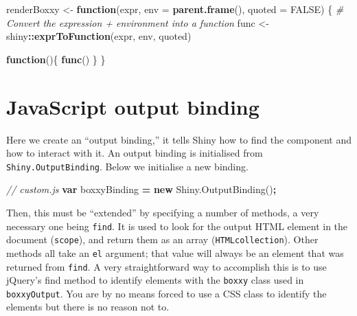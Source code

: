 \documentclass[
]{krantz}
\makeatletter
\newenvironment{Shaded}{\begin{snugshade}}{\end{snugshade}}
\newcommand{\AttributeTok}[1]{\textcolor[rgb]{0.61,0.61,0.61}{#1}}
\newcommand{\CommentTok}[1]{\textcolor[rgb]{0.37,0.37,0.37}{\textit{#1}}}
\newcommand{\ControlFlowTok}[1]{\textcolor[rgb]{0.27,0.27,0.27}{\textbf{#1}}}
\newcommand{\DataTypeTok}[1]{\textcolor[rgb]{0.27,0.27,0.27}{#1}}
\newcommand{\KeywordTok}[1]{\textcolor[rgb]{0.27,0.27,0.27}{\textbf{#1}}}
\newcommand{\NormalTok}[1]{#1}
\newcommand{\OperatorTok}[1]{\textcolor[rgb]{0.43,0.43,0.43}{\textbf{#1}}}
\newcommand{\OtherTok}[1]{\textcolor[rgb]{0.37,0.37,0.37}{#1}}
\newcommand{\StringTok}[1]{\textcolor[rgb]{0.5,0.5,0.5}{#1}}
\newcommand{\VariableTok}[1]{\textcolor[rgb]{0,0,0}{#1}}
\newenvironment{kframe}{%
\medskip{}
\setlength{\fboxsep}{.8em}
 \def\at@end@of@kframe{}%
 \ifinner\ifhmode%
  \def\at@end@of@kframe{\end{minipage}}%
  \begin{minipage}{\columnwidth}%
 \fi\fi%
 \def\FrameCommand##1{\hskip\@totalleftmargin \hskip-\fboxsep
 \colorbox{shadecolor}{##1}\hskip-\fboxsep
     \hskip-\linewidth \hskip-\@totalleftmargin \hskip\columnwidth}%
 \MakeFramed {\advance\hsize-\width
   \@totalleftmargin\z@ \linewidth\hsize
   \@setminipage}}%
 {\par\unskip\endMakeFramed%
 \at@end@of@kframe}
\renewenvironment{Shaded}{\begin{kframe}}{\end{kframe}}
\makeatother
\begin{document}
\begin{Shaded}
\begin{Highlighting}[]
\NormalTok{renderBoxxy <{-}}\StringTok{ }\ControlFlowTok{function}\NormalTok{(expr, }\DataTypeTok{env =} \KeywordTok{parent.frame}\NormalTok{(), }
  \DataTypeTok{quoted =} \OtherTok{FALSE}\NormalTok{) \{}
  \CommentTok{\# Convert the expression + environment into a function}
\NormalTok{  func <{-}}\StringTok{ }\NormalTok{shiny}\OperatorTok{::}\KeywordTok{exprToFunction}\NormalTok{(expr, env, quoted)}

  \ControlFlowTok{function}\NormalTok{()\{}
    \KeywordTok{func}\NormalTok{()}
\NormalTok{  \}}
\NormalTok{\}}
\end{Highlighting}
\end{Shaded}

\hypertarget{javascript-output-binding}{%
\section{JavaScript output binding}\label{javascript-output-binding}}

Here we create an ``output binding,'' it tells Shiny how to find the component and how to interact with it. An output binding is initialised from \texttt{Shiny.OutputBinding}. Below we initialise a new binding.

\begin{Shaded}
\begin{Highlighting}[]
\CommentTok{// custom.js}
\KeywordTok{var}\NormalTok{ boxxyBinding }\OperatorTok{=} \KeywordTok{new} \VariableTok{Shiny}\NormalTok{.}\AttributeTok{OutputBinding}\NormalTok{()}\OperatorTok{;}
\end{Highlighting}
\end{Shaded}

Then, this must be ``extended'' by specifying a number of methods, a very necessary one being \texttt{find}. It is used to look for the output HTML element in the document (\texttt{scope}), and return them as an array (\texttt{HTMLcollection}). Other methods all take an \texttt{el} argument; that value will always be an element that was returned from \texttt{find}. A very straightforward way to accomplish this is to use jQuery's find method to identify elements with the \texttt{boxxy} class used in \texttt{boxxyOutput}. You are by no means forced to use a CSS class to identify the elements but there is no reason not to.
\end{document}
